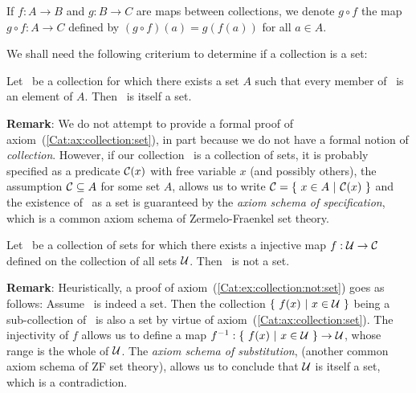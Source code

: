 \begin{notation}\label{Cat:ax:composition}
    If $f:A\to B$ and $g:B\to C$ are maps between collections,
    we denote $g\circ f$ the map $g\circ f:A\to C$ defined by 
    $(g\circ f)(a) = g(f(a))$ for all $a\in A$.
\end{notation}

We shall need the following criterium to determine if a
collection is a set:

\begin{axiom}\label{Cat:ax:collection:set}
    Let \Cat\ be a collection for which there exists a set $A$ such
    that every member of \Cat\ is an element of $A$. Then \Cat\ is
    itself a set.
\end{axiom}
\noindent
{\bf Remark}: We do not attempt to provide a formal proof of 
axiom~(\ref{Cat:ax:collection:set}), in part because we do not have
a formal notion of {\em collection}. However, if our collection \Cat\
is a collection of sets, it is probably specified as a predicate 
$\mbox{$\cal C$}(x)$ with free variable $x$ (and possibly others), the assumption 
$\mbox{$\cal C$}\subseteq A$ for some set $A$, allows us to write 
$\Cat=\{\ x\in A\ |\ \Cat(x)\ \}$ and the existence of \Cat\ as a set 
is guaranteed by the {\em axiom schema of specification}, which is a 
common axiom schema of Zermelo-Fraenkel set theory.

\begin{axiom}\label{Cat:ex:collection:not:set}
    Let \Cat\ be a collection of sets for which there exists a 
    injective map $f:{\cal U}\to\mbox{$\cal C$}$ defined on the collection 
    of all sets $\cal U$. Then \Cat\ is not a set.
\end{axiom}
\noindent
{\bf Remark}: Heuristically, a proof of axiom~(\ref{Cat:ex:collection:not:set})
goes as follows: Assume \Cat\ is indeed a set. Then the collection
$\{\ f(x)\ |\ x\in{\cal U}\ \}$ being a sub-collection of \Cat\ is also a set 
by virtue of axiom~(\ref{Cat:ax:collection:set}). The injectivity of $f$ 
allows us to define a map $f^{-1}:\{\ f(x)\ |\ x\in{\cal U}\ \}\to{\cal U}$,
whose range is the whole of $\cal U$. The {\em axiom schema of substitution},
(another common axiom schema of ZF set theory), allows us to conclude that 
$\cal U$ is itself a set, which is a contradiction.
